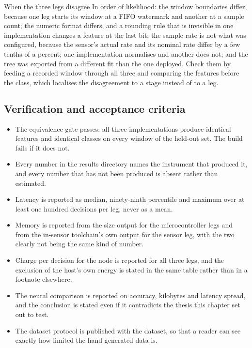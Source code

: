 \begin{note}{When the three legs disagree}
In order of likelihood: the window boundaries differ, because one leg starts its
window at a FIFO watermark and another at a sample count; the numeric format
differs, and a rounding rule that is invisible in one implementation changes a
feature at the last bit; the sample rate is not what was configured, because the
sensor's actual rate and its nominal rate differ by a few tenths of a percent;
one implementation normalises and another does not; and the tree was exported
from a different fit than the one deployed. Check them by feeding a recorded
window through all three and comparing the features before the class, which
localises the disagreement to a stage instead of to a leg.
\end{note}

\subsection*{Verification and acceptance criteria}

\begin{itemize}
\item The equivalence gate passes: all three implementations produce identical
features and identical classes on every window of the held-out set. The build
fails if it does not.
\item Every number in the results directory names the instrument that produced
it, and every number that has not been produced is absent rather than estimated.
\item Latency is reported as median, ninety-ninth percentile and maximum over at
least one hundred decisions per leg, never as a mean.
\item Memory is reported from the size output for the microcontroller legs and
from the in-sensor toolchain's own output for the sensor leg, with the two
clearly not being the same kind of number.
\item Charge per decision for the node is reported for all three legs, and the
exclusion of the host's own energy is stated in the same table rather than in a
footnote elsewhere.
\item The neural comparison is reported on accuracy, kilobytes and latency
spread, and the conclusion is stated even if it contradicts the thesis this
chapter set out to test.
\item The dataset protocol is published with the dataset, so that a reader can
see exactly how limited the hand-generated data is.
\end{itemize}

